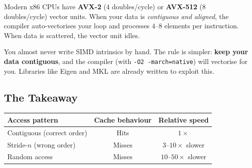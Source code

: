 Modern x86 CPUs have \textbf{AVX-2} (4 doubles/cycle) or \textbf{AVX-512}
(8 doubles/cycle) vector units.  When your data is \emph{contiguous and
aligned}, the compiler auto-vectorises your loop and processes 4--8 elements
per instruction.  When data is scattered, the vector unit idles.

\begin{tipbox}
You almost never write SIMD intrinsics by hand.
The rule is simpler: \textbf{keep your data contiguous}, and the
compiler (with \texttt{-O2 -march=native}) will vectorise for you.
Libraries like Eigen and MKL are already written to exploit this.
\end{tipbox}

\subsection{The Takeaway}

\begin{center}
\renewcommand{\arraystretch}{1.3}
\begin{tabular}{@{}lcc@{}}
\toprule
\textbf{Access pattern} & \textbf{Cache behaviour} & \textbf{Relative speed} \\
\midrule
Contiguous (correct order) & Hits    & $1\times$ \\
Stride-$n$ (wrong order)   & Misses  & $3$--$10\times$ slower \\
Random access              & Misses  & $10$--$50\times$ slower \\
\bottomrule
\end{tabular}
\end{center}
